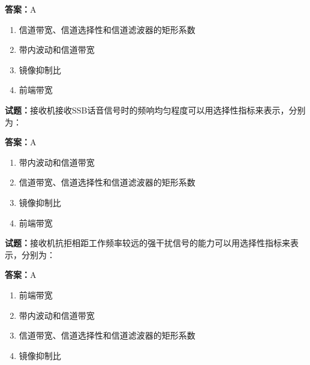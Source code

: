 \documentclass{ctexbook}
\begin{document}
\textbf{答案：}A 

\begin{enumerate}[leftmargin=3em]
  \item 信道带宽、信道选择性和信道滤波器的矩形系数 

  \item 带内波动和信道带宽 

  \item 镜像抑制比 

  \item 前端带宽 

\end{enumerate}





\vspace{1em}

\textbf{试题：}接收机接收SSB话音信号时的频响均匀程度可以用选择性指标来表示，分别为： 


\textbf{答案：}A 

\begin{enumerate}[leftmargin=3em]
  \item 带内波动和信道带宽 

  \item 信道带宽、信道选择性和信道滤波器的矩形系数 

  \item 镜像抑制比 

  \item 前端带宽 

\end{enumerate}





\vspace{1em}

\textbf{试题：}接收机抗拒相距工作频率较远的强干扰信号的能力可以用选择性指标来表示，分别为： 

\textbf{答案：}A 

\begin{enumerate}[leftmargin=3em]
  \item 前端带宽 

  \item 带内波动和信道带宽 

  \item 信道带宽、信道选择性和信道滤波器的矩形系数 

  \item 镜像抑制比 

\end{enumerate}
\end{document}
